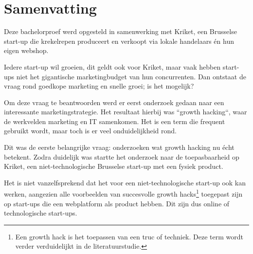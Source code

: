 
%
%


\chapter*{Samenvatting}

Deze bachelorproef werd opgesteld in samenwerking met Kriket, een Brusselse start-up die krekelrepen produceert en verkoopt via lokale handelaars én hun eigen webshop. 

Iedere start-up wil groeien, dit geldt ook voor Kriket, maar vaak hebben start-ups niet het gigantische marketingbudget van hun concurrenten. Dan ontstaat de vraag rond goedkope marketing en snelle groei; is het mogelijk?

Om deze vraag te beantwoorden werd er eerst onderzoek gedaan naar een interessante marketingstrategie. Het resultaat hierbij was ``growth hacking``, waar de werkvelden marketing en IT samenkomen. Het is een term die frequent gebruikt wordt, maar toch is er veel onduidelijkheid rond.

Dit was de eerste belangrijke vraag: onderzoeken wat growth hacking nu écht betekent. Zodra duidelijk was startte het onderzoek naar de toepasbaarheid op Kriket, een niet-technologische Brusselse start-up met een fysiek product. 

Het is niet vanzelfsprekend dat het voor een niet-technologische start-up ook kan werken, aangezien alle voorbeelden van succesvolle growth hacks\footnote{Een growth hack is het toepassen van een truc of techniek. Deze term wordt verder verduidelijkt in de literatuurstudie.} toegepast zijn op start-ups die een webplatform als product hebben. Dit zijn dus online of technologische start-ups.

